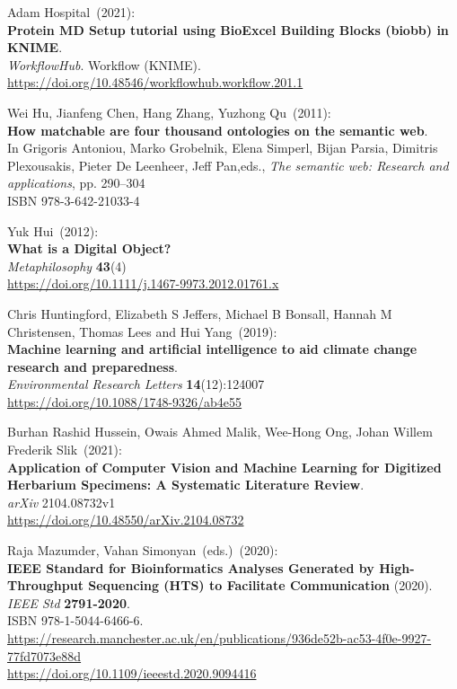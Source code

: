 \begin{thebibliography}{9}
Adam Hospital~(2021): \\
\textbf{Protein MD Setup tutorial using BioExcel Building Blocks (biobb)
in KNIME}.\\
\emph{WorkflowHub}. Workflow (KNIME).\\
\url{https://doi.org/10.48546/workflowhub.workflow.201.1}

Wei Hu, Jianfeng Chen, Hang Zhang, Yuzhong Qu~(2011): \\
\textbf{How matchable are four thousand ontologies on the semantic web}. \\
In Grigoris
Antoniou, Marko Grobelnik, Elena Simperl, Bijan Parsia, Dimitris
Plexousakis, Pieter De Leenheer, Jeff Pan,eds., \emph{The semantic
web: {Research} and applications}, pp. 290--304 \\
ISBN 978-3-642-21033-4

Yuk Hui~(2012): \\
\textbf{What is a Digital Object?}\\
\emph{Metaphilosophy} \textbf{43}(4)\\
\url{https://doi.org/10.1111/j.1467-9973.2012.01761.x}

Chris Huntingford, Elizabeth S Jeffers, Michael B Bonsall, Hannah M Christensen, Thomas Lees and Hui Yang~(2019): \\
\textbf{Machine learning and artificial intelligence to aid climate change research and preparedness}.\\
\emph{Environmental Research Letters} \textbf{14}(12):124007\\
\url{https://doi.org/10.1088/1748-9326/ab4e55}

Burhan Rashid Hussein, Owais Ahmed Malik, Wee-Hong Ong, Johan Willem Frederik Slik~(2021): \\
\textbf{Application of Computer Vision and Machine Learning for Digitized
Herbarium Specimens: A Systematic Literature Review}.\\
\emph{arXiv} 2104.08732v1\\
\url{https://doi.org/10.48550/arXiv.2104.08732}

Raja Mazumder, Vahan Simonyan~(eds.)~(2020): \\
\textbf{IEEE Standard for Bioinformatics Analyses Generated by
High-Throughput Sequencing (HTS) to Facilitate Communication} (2020).\\
\emph{IEEE Std} \textbf{2791-2020}.\\
ISBN 978-1-5044-6466-6.\\
\url{https://research.manchester.ac.uk/en/publications/936de52b-ac53-4f0e-9927-77fd7073e88d}\\
\url{https://doi.org/10.1109/ieeestd.2020.9094416}


\end{thebibliography}
